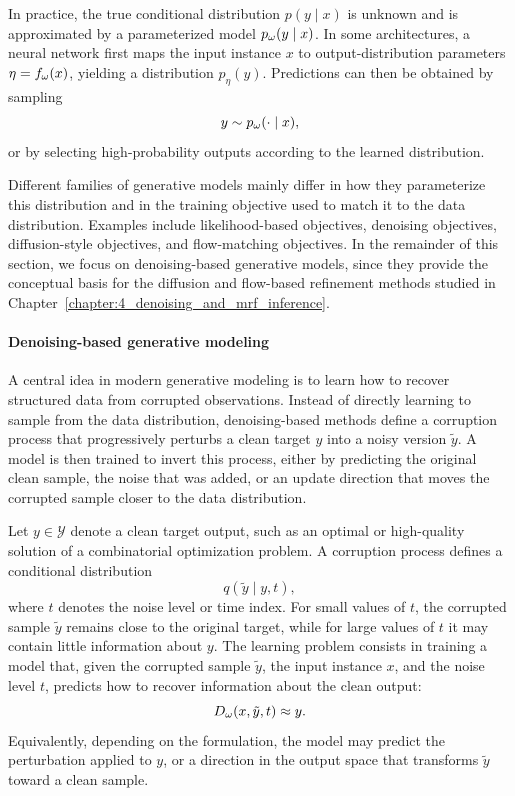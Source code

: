 In practice, the true conditional distribution $p(y \mid x)$ is unknown and is approximated by a parameterized model $p_{\omega}(y \mid x)$. In some architectures, a neural network first maps the input instance $x$ to output-distribution parameters $\eta=f_{\omega}(x)$, yielding a distribution $p_{\eta}(y)$. Predictions can then be obtained by sampling
\begin{equation}
    y \sim p_{\omega}(\cdot \mid x),
\end{equation}
or by selecting high-probability outputs according to the learned distribution.

Different families of generative models mainly differ in how they parameterize this distribution and in the training objective used to match it to the data distribution. Examples include likelihood-based objectives, denoising objectives, diffusion-style objectives, and flow-matching objectives. In the remainder of this section, we focus on denoising-based generative models, since they provide the conceptual basis for the diffusion and flow-based refinement methods studied in Chapter~\ref{chapter:4_denoising_and_mrf_inference}.



\paragraph{Denoising-based generative modeling}

A central idea in modern generative modeling is to learn how to recover structured data from corrupted observations. Instead of directly learning to sample from the data distribution, denoising-based methods define a corruption process that progressively perturbs a clean target $y$ into a noisy version $\tilde{y}$. A model is then trained to invert this process, either by predicting the original clean sample, the noise that was added, or an update direction that moves the corrupted sample closer to the data distribution.

Let $y \in \mathcal{Y}$ denote a clean target output, such as an optimal or high-quality solution of a combinatorial optimization problem. A corruption process defines a conditional distribution
\begin{equation}
    q(\tilde{y} \mid y, t),
\end{equation}
where $t$ denotes the noise level or time index. For small values of $t$, the corrupted sample $\tilde{y}$ remains close to the original target, while for large values of $t$ it may contain little information about $y$. The learning problem consists in training a model that, given the corrupted sample $\tilde{y}$, the input instance $x$, and the noise level $t$, predicts how to recover information about the clean output:
\begin{equation}
    D_{\omega}(x, \tilde{y}, t) \approx y.
\end{equation}
Equivalently, depending on the formulation, the model may predict the perturbation applied to $y$, or a direction in the output space that transforms $\tilde{y}$ toward a clean sample.


